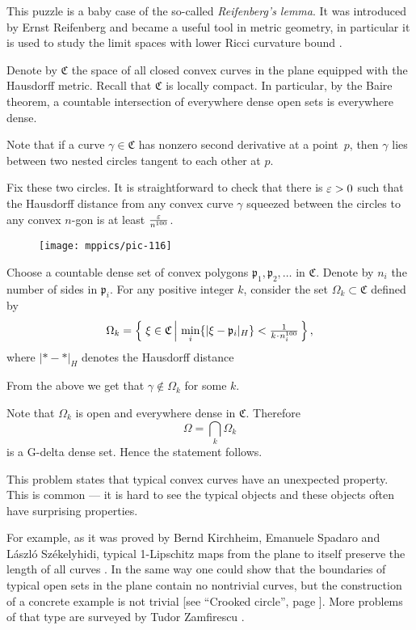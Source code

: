 This puzzle is a baby case of the so-called \emph{Reifenberg's lemma}.
It was introduced by Ernst Reifenberg \cite{reifenberg} and became a useful tool in metric geometry, in particular it is used to study the limit spaces with lower Ricci curvature bound \cite{cheeger-colding-1, naber}.


Denote by $\mathfrak{C}$ the space of all closed convex curves in the plane equipped with the Hausdorff metric.
Recall that $\mathfrak{C}$ is locally compact.
In particular, by the Baire theorem, a countable intersection of everywhere dense open sets is everywhere dense.

Note that if a curve $\gamma\in\mathfrak{C}$ has nonzero second derivative at a point~$p$,
then $\gamma$ lies between two nested circles tangent to each other at $p$.

Fix these two circles.
It is straightforward to check that there is $\varepsilon>0$ such that 
the Hausdorff distance from any convex curve $\gamma$ squeezed between the circles 
to any convex $n$-gon is at least $\frac{\varepsilon}{n^{100}}$.

\begin{wrapfigure}{o}{41 mm}
\vskip-0mm
\centering
\texttt{[image: mppics/pic-116]}
\end{wrapfigure}

Choose a countable dense set of convex polygons $\mathfrak{p}_1,\mathfrak{p}_2,\dots$ in $\mathfrak{C}$.
Denote by $n_i$ the number of sides in $\mathfrak{p}_i$.
For any positive integer $k$,
consider the set $\Omega_k\subset\mathfrak{C}$ defined by 
\[\Omega_k
=
\set{\xi\in \mathfrak{C}}{\min_i\{|\xi-\mathfrak{p}_i|_{H}\}<\tfrac1{k\cdot n_i^{100}}},\]
where $|{*}-{*}|_H$ denotes the Hausdorff distance 

From the above we get that $\gamma\notin\Omega_k$ for some $k$. 

Note that $\Omega_k$ is open and everywhere dense in $\mathfrak{C}$.
Therefore 
\[\Omega=\bigcap_k\Omega_k\]
is a G-delta dense set.
Hence the statement follows.\qeds

This problem states that typical convex curves have an unexpected property.
This is common --- it is hard to see the typical objects and these objects often have surprising properties.

For example, as it was proved by
Bernd Kirchheim, 
Emanuele Spadaro 
and 
L{\'a}szl{\'o} Sz{\'e}kelyhidi,
typical 1-Lipschitz maps from the plane to itself preserve the length of all curves \cite{KSS}.
In the same way one could show that the boundaries of typical open sets in the plane contain no nontrivial curves, 
but the construction of a concrete example is not trivial
[see ``Crooked circle'', page \pageref{Crooked circle}].
More problems of that type are surveyed by Tudor Zamfirescu \cite{zamfirescu}.







